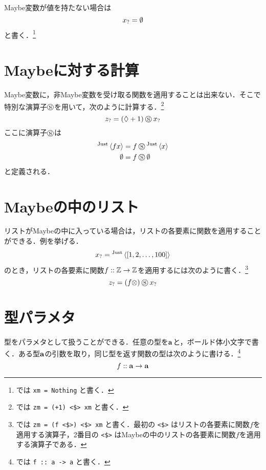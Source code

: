 \documentclass[platex,a5paper,twoside,fleqn,draft]{jsbook}
\begin{document}
Maybe変数が値を持たない場合は
\begin{equation}
{x}_?=\emptyset
\end{equation}
と書く．\footnote{\haskell では \verb|xm = Nothing| と書く．}

\section{Maybeに対する計算}

Maybe変数に，非Maybe変数を受け取る関数を適用することは出来ない．そこで特別な演算子$\mathbin{\circledS}$を用いて，次のように計算する．\footnote{\haskell では \verb|zm = (+1) <$> xm| と書く．}
\begin{equation}
{z}_?=(\mathord{\lozenge}+1)\mathbin{\circledS}{x}_?
\end{equation}
ここに演算子$\mathbin{\circledS}$は
\begin{align}
{}^{\text{Just}}\left\langle fx\right\rangle&=f\mathbin{\circledS}{}^{\text{Just}}\left\langle x\right\rangle\\
\emptyset&=f\mathbin{\circledS}\emptyset
\end{align}
と定義される．

\section{Maybeの中のリスト}

リストがMaybeの中に入っている場合は，リストの各要素に関数を適用することができる．例を挙げる．
\begin{equation}
{x}_?={}^{\text{Just}}\left\langle[1,2,\dots,100]\right\rangle
\end{equation}
のとき，リストの各要素に関数$f::\mathord{\mathbb{Z}}\rightarrow\mathord{\mathbb{Z}}$を適用するには次のように書く．\footnote{\haskell では \verb|zm = (f <$>) <$> xm| と書く．最初の \verb|<$>| はリストの各要素に関数$f$を適用する演算子，2番目の \verb|<$>| はMaybeの中のリストの各要素に関数$f$を適用する演算子である．}
\begin{equation}
{z}_?=(f\otimes)\mathbin{\circledS}{x}_?
\end{equation}

\section{型パラメタ}

型をパラメタとして扱うことができる．任意の型を$\mathbf{a}$と，ボールド体小文字で書く．ある型$\mathbf{a}$の引数を取り，同じ型を返す関数の型は次のように書ける．\footnote{\haskell では \verb|f :: a -> a| と書く．}
\begin{equation}
f::\mathbf{a}\rightarrow\mathbf{a}
\end{equation}
\end{document}
